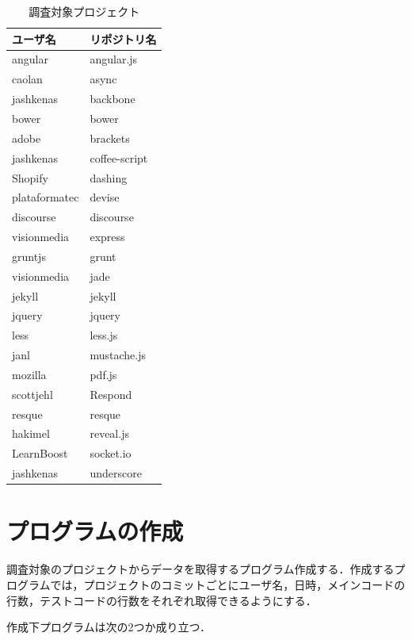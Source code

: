 \begin{table}[h]
 \begin{center}
 \caption{調査対象プロジェクト}
  \begin{tabular}{|l|l|} \hline
    ユーザ名 & リポジトリ名\\ \hline
    angular & angular.js\\ \hline
    caolan & async\\ \hline
    jashkenas & backbone\\ \hline
    bower & bower\\ \hline
    adobe & brackets\\ \hline
    jashkenas & coffee-script\\ \hline
    Shopify & dashing\\ \hline
    plataformatec & devise\\ \hline
    discourse & discourse\\ \hline
    visionmedia & express\\ \hline
    gruntjs & grunt\\ \hline
    visionmedia & jade\\ \hline
    jekyll & jekyll\\ \hline
    jquery & jquery\\ \hline
    less & less.js\\ \hline
    janl & mustache.js\\ \hline
    mozilla & pdf.js\\ \hline
    scottjehl & Respond\\ \hline
    resque & resque\\ \hline
    hakimel & reveal.js\\ \hline
    LearnBoost & socket.io\\ \hline
    jashkenas & underscore\\ \hline
  \end{tabular}
  \label{tab:project}
  \end{center}
\end{table}

\newpage

\section{プログラムの作成}
調査対象のプロジェクトからデータを取得するプログラム作成する．作成するプログラムでは，プロジェクトのコミットごとにユーザ名，日時，メインコードの行数，テストコードの行数をそれぞれ取得できるようにする．

作成下プログラムは次の2つか成り立つ．

